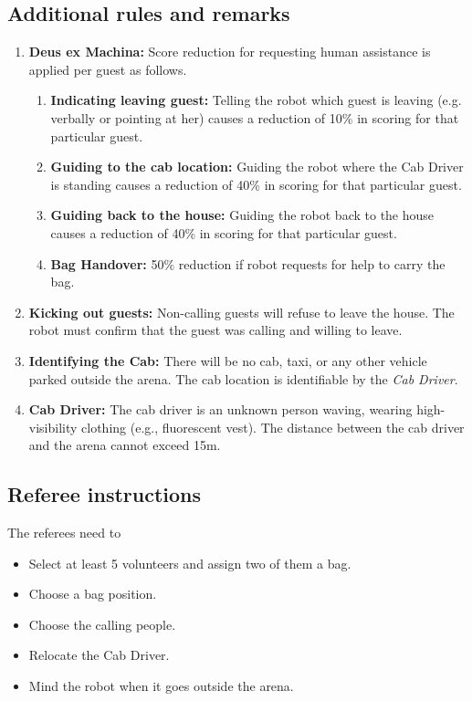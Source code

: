 \subsection{Additional rules and remarks}
\begin{enumerate}[nosep]
	\item \textbf{Deus ex Machina:} Score reduction for requesting human assistance is applied per guest as follows.
	\begin{enumerate}[nosep]
		\item \textbf{Indicating leaving guest:} Telling the robot which guest is leaving (e.g. verbally or pointing at her) causes a reduction of 10\% in scoring for that particular guest.

		\item \textbf{Guiding to the cab location:} Guiding the robot where the Cab Driver is standing causes a reduction of 40\% in scoring for that particular guest.

		\item \textbf{Guiding back to the house:} Guiding the robot back to the house causes a reduction of 40\% in scoring for that particular guest.

		\item \textbf{Bag Handover:} 50\% reduction if robot requests for help to carry the bag.
	\end{enumerate}

	\item \textbf{Kicking out guests:} Non-calling guests will refuse to leave the house. The robot must confirm that the guest was calling and willing to leave.
	
	\item \textbf{Identifying the Cab:} There will be no cab, taxi, or any other vehicle parked outside the arena.
	The cab location is identifiable by the \emph{Cab Driver}.

	\item \textbf{Cab Driver:} The cab driver is an unknown person waving, wearing high-visibility clothing (e.g., fluorescent vest).
	The distance between the cab driver and the arena cannot exceed 15m.
	
\end{enumerate}


\subsection{Referee instructions}

The referees need to
\begin{itemize}
	\item Select at least 5 volunteers and assign two of them a bag.
	\item Choose a bag position.
	\item Choose the calling people.
	\item Relocate the Cab Driver.
	\item Mind the robot when it goes outside the arena.
\end{itemize}


